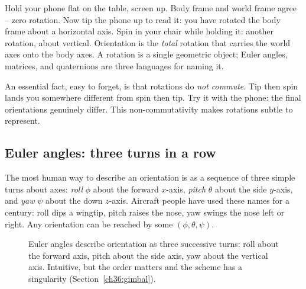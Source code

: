 \begin{intuitionbox}
Hold your phone flat on the table, screen up. Body frame and world frame agree --
zero rotation. Now tip the phone up to read it: you have rotated the body frame about
a horizontal axis. Spin in your chair while holding it: another rotation, about
vertical. Orientation is the \emph{total} rotation that carries the world axes onto the
body axes. A rotation is a single geometric object; Euler angles, matrices, and quaternions are three languages for naming it.
\end{intuitionbox}

An essential fact, easy to forget, is that rotations do \emph{not commute}. Tip then
spin lands you somewhere different from spin then tip. Try it with the phone: the final
orientations genuinely differ. This non-commutativity makes rotations subtle to represent.

\subsection{Euler angles: three turns in a row}
\label{ch36:euler}

The most human way to describe an orientation is as a sequence of three simple turns
about axes: \emph{roll} $\phi$ about the forward $x$-axis, \emph{pitch} $\theta$ about
the side $y$-axis, and \emph{yaw} $\psi$ about the down $z$-axis. Aircraft people have
used these names for a century: roll dips a wingtip, pitch raises the nose, yaw swings
the nose left or right. Any orientation can be reached by some $(\phi,\theta,\psi)$.

\begin{figure}[H]
\centering
{}
\caption{Euler angles describe orientation as three successive turns: roll about the
forward axis, pitch about the side axis, yaw about the vertical axis. Intuitive, but
the order matters and the scheme has a singularity (Section~\ref{ch36:gimbal}).}
\label{ch36:fig-euler}
\end{figure}

